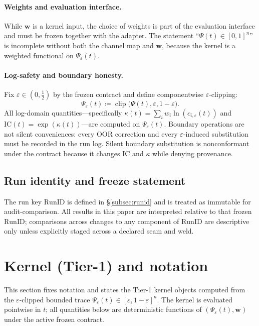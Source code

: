 \documentclass[
  aps,
  prd,
  preprint,
  superscriptaddress,
  nofootinbib,
  floatfix
]{revtex4-2}
\DeclareMathOperator{\clip}{clip}
\newcommand{\IC}{\mathrm{IC}}
\begin{document}
\paragraph{Weights and evaluation interface.}
While $\bm{w}$ is a kernel input, the choice of weights is part of the evaluation interface and must be frozen
together with the adapter. The statement ``$\Psi(t)\in[0,1]^n$'' is incomplete without both the channel map and
$\bm{w}$, because the kernel is a weighted functional on $\Psi_\varepsilon(t)$.

\paragraph{Log-safety and boundary honesty.}
Fix $\varepsilon\in(0,\tfrac12)$ by the frozen contract and define componentwise $\varepsilon$-clipping:
\begin{equation}
  \Psi_\varepsilon(t)\coloneqq \clip\bigl(\Psi(t),\varepsilon,1-\varepsilon\bigr).
\end{equation}
All log-domain quantities---specifically $\kappa(t)=\sum_i w_i\ln(c_{i,\varepsilon}(t))$ and
$\IC(t)=\exp(\kappa(t))$---are computed on $\Psi_\varepsilon(t)$.
Boundary operations are not silent conveniences: every OOR correction and every $\varepsilon$-induced substitution
must be recorded in the run log. Silent boundary substitution is nonconformant under the contract because it changes
$\IC$ and $\kappa$ while denying provenance.

\subsection{Run identity and freeze statement}
\label{subsec:runid_pointer}
The run key $\mathrm{RunID}$ is defined in \S\ref{subsec:runid} and is treated as immutable for audit-comparison.
All results in this paper are interpreted relative to that frozen $\mathrm{RunID}$; comparisons across changes
to any component of $\mathrm{RunID}$ are descriptive only unless explicitly staged across a declared seam and weld.

\section{Kernel (Tier-1) and notation}
\label{sec:kernel}

This section fixes notation and states the Tier-1 kernel objects computed from the $\varepsilon$-clipped bounded trace
$\Psi_\varepsilon(t)\in[\varepsilon,1-\varepsilon]^n$. The kernel is evaluated pointwise in $t$; all quantities below are
deterministic functions of $(\Psi_\varepsilon(t),\bm{w})$ under the active frozen contract.
\end{document}
